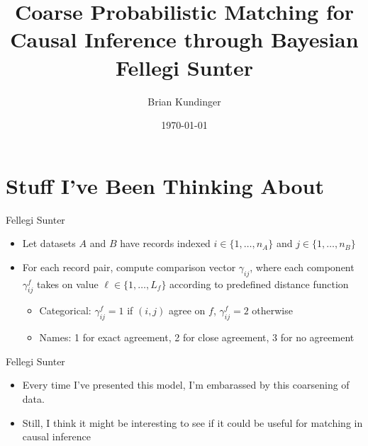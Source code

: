 \documentclass{beamer}
\begin{document}
	\title{Coarse Probabilistic Matching for Causal Inference through Bayesian Fellegi Sunter}
	\author{Brian Kundinger}
	\date{\today}
	

	
	\begin{frame}
		\titlepage
	\end{frame}

\section{Stuff I've Been Thinking About}

\begin{frame}{Fellegi Sunter}
	\begin{itemize}
		\item Let datasets $A$ and $B$ have records indexed $i \in \{1, \ldots, n_A\}$ and $j \in \{1, \ldots, n_B\}$
		\item For each record pair, compute comparison vector $\gamma_{ij}$, where
		each component $\gamma_{ij}^f$ takes on value $\ell \in \{1, \ldots, L_f\}$ according to predefined distance function
		\begin{itemize}
			\item Categorical: $\gamma_{ij}^f  = 1$ if $(i, j)$ agree on $f$, $\gamma_{ij}^f  = 2$ otherwise
			\item Names: 1 for exact agreement, 2 for close agreement, 3 for no agreement
		\end{itemize}
	\end{itemize}
\end{frame}

\begin{frame}{Fellegi Sunter}
	\begin{itemize}
		\item Every time I've presented this model, I'm embarassed by this coarsening of data.
		\item Still, I think it might be interesting to see if it could be useful for matching in causal inference
	\end{itemize}
\end{frame}
\end{document}
